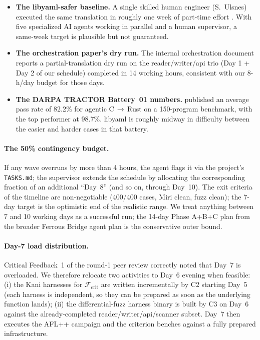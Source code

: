 \documentclass[12pt]{article}
\theoremstyle{definition}
\theoremstyle{remark}
\begin{document}
\begin{itemize}
\item \textbf{The libyaml-safer baseline.} A single skilled human
  engineer (S.~Ulsnes) executed the same translation in roughly one
  week of part-time effort \cite{simonask2024}. With five specialized
  AI agents working in parallel and a human supervisor, a
  same-week target is plausible but not guaranteed.
\item \textbf{The orchestration paper's dry run.} The internal
  orchestration document \cite{ferrousbridge2026orchestration}
  reports a partial-translation dry run on the reader/writer/api
  trio (Day 1 + Day 2 of our schedule) completed in 14 working
  hours, consistent with our 8-h/day budget for those days.
\item \textbf{The DARPA TRACTOR Battery~01 numbers.}
  \cite{tractor2024} published an average pass rate of 82.2\% for
  agentic C\,$\to$\,Rust on a 150-program benchmark, with the top
  performer at 98.7\%. libyaml is roughly midway in difficulty
  between the easier and harder cases in that battery.
\end{itemize}

\paragraph{The 50\% contingency budget.} If any wave overruns by more
than 4 hours, the agent flags it via the project's
\texttt{TASKS.md}; the supervisor extends the schedule by allocating
the corresponding fraction of an additional ``Day~8'' (and so on,
through Day~10). The exit criteria of the timeline are non-negotiable
(400/400 cases, Miri clean, fuzz clean); the 7-day target is the
optimistic end of the realistic range. We treat anything between 7 and
10 working days as a successful run; the 14-day Phase A+B+C plan from
the broader Ferrous Bridge agent plan
\cite{ferrousbridge2026orchestration} is the conservative outer bound.

\paragraph{Day-7 load distribution.} Critical Feedback~1 of the round-1
peer review correctly noted that Day~7 is overloaded. We therefore
relocate two activities to Day~6 evening when feasible: (i) the Kani
harnesses for $\mathcal{F}_{\mathrm{crit}}$ are written incrementally
by C2 starting Day~5 (each harness is independent, so they can be
prepared as soon as the underlying function lands); (ii) the
differential-fuzz harness binary is built by C3 on Day~6 against the
already-completed reader/writer/api/scanner subset. Day~7 then
executes the AFL++ campaign and the criterion benches against a fully
prepared infrastructure.
\end{document}

